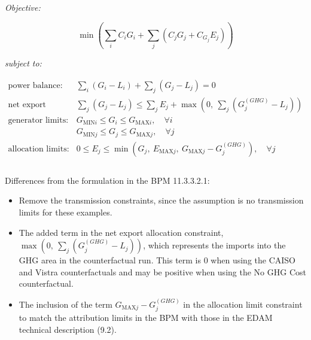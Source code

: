 \documentclass{article}
\begin{document}
\textit{Objective:}

\[
\min \left( \sum_i C_i G_i + \sum_j (C_j G_j + C_{G_j} E_j) \right)
\]

\textit{subject to:}

\begin{align*}
\text{power balance:} \quad & \sum_i (G_i - L_i) + \sum_j (G_j - L_j) = 0 \\
\text{net export allocation:} & \sum_j (G_j - L_j) \leq \sum_j E_j  +  \max(0, ~ \sum_j ( G_j^{(GHG)} - L_j ))\\
\text{generator limits:} \quad & G_{\text{MIN}i} \leq G_i \leq G_{\text{MAX}i}, \quad \forall i \\
& G_{\text{MIN}j} \leq G_j \leq G_{\text{MAX}j}, \quad \forall j \\
\text{allocation limits:} \quad & 0 \leq E_j \leq \min(G_j, ~E_{\text{MAX}j}, ~G_{\text{MAX}j} - G_j^{(GHG)}), \quad \forall j \\\\
\end{align*}

Differences from the formulation in the BPM 11.3.3.2.1:\\
\begin{itemize}
\item Remove the transmission constraints, since the assumption is no transmission limits for these examples.\\
\item The added term in the net export allocation constraint, \\$ \max(0, ~ \sum_j ( G_j^{(GHG)} - L_j ))$, which represents the imports into the GHG area in the counterfactual run.
This term is $0$ when using the CAISO and Vistra counterfactuals and may be positive when using the No GHG Cost counterfactual.\\
\item The inclusion of the term $G_{\text{MAX}j} - G_j^{(GHG)}$ in the allocation limit constraint to match the attribution limits in the BPM with those in the EDAM technical description (9.2).
\end{itemize}
\end{document}
